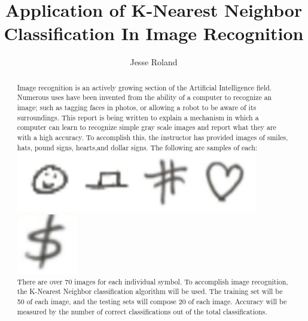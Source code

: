 \documentclass[]{report}
\title{Application of K-Nearest Neighbor Classification In Image Recognition}
\author{Jesse Roland}
\begin{document}
\maketitle


\begin{abstract}

	{\fontsize{14}{4}\selectfont Image recognition is an actively growing section of the Artificial Intelligence field. Numerous uses have been invented from the ability of a computer to recognize an image; such as tagging faces in photos, or allowing a robot to be aware of its surroundings. This report is being written to explain a mechanism in which a computer can learn to recognize simple gray scale images and report what they are with a high accuracy. To accomplish this, the instructor has provided images of smiles, hats, pound signs, hearts,and dollar signs. The following are samples of each:\\
	\includegraphics{01/02}\includegraphics{02/02}\includegraphics{03/02}\includegraphics{04/02}\includegraphics{05/02}
	\\There are over 70 images for each individual symbol. To accomplish image recognition, the K-Nearest Neighbor classification algorithm will be used. The training set will be 50 of each image, and the testing sets will compose 20 of each image. Accuracy will be measured by the number of correct classifications out of the total classifications.}
\end{abstract}
\end{document}
